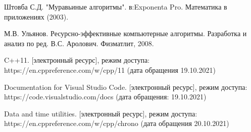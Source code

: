 \renewcommand\bibname{Список литературы}
\begin{thebibliography}{3}
	Штовба С.Д. "Муравьиные алгоритмы". в:Exponenta Pro. Математика в приложениях (2003).
	
	М.В. Ульянов. Ресурсно-эффективные компьютерные алгоритмы. Разработка и анализ по ред. В.С. Аролович. Физматлит, 2008.
	
	C++11. [электронный ресурс], режим доступа: https://en.cppreference.com/w/cpp/11 (дата обращения 19.10.2021)
	
	Documentation for Visual Studio Code. [электронный ресурс], режим доступа: https://code.visualstudio.com/docs (дата обращения: 19.10.2021)
	
	Data and time utilities. [электронный ресурс], режим доступа: https://en.cppreference.com/w/cpp/chrono (дата обращения 20.10.2021)

	
\end{thebibliography}
